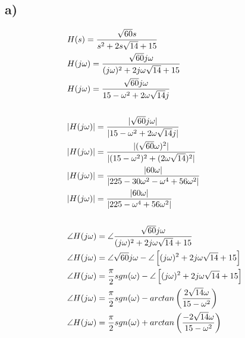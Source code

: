 \documentclass[11pt, fleqn]{article}
\begin{document}
\subsection*{a)}
\begin{align*}
    &H(s) = \frac{\sqrt{60}s}{s^2 + 2s\sqrt{14} + 15} \\
    &H(j\w) = \frac{\sqrt{60}j\w}{(j\w)^2 + 2j\w \sqrt{14} + 15} \\
    &H(j\w) = \frac{\sqrt{60}j\w}{15 - \w^2 + 2\w \sqrt{14}j} \\
    &\vspace*{2mm} \\
    &|H(j\w)| = \frac{|\sqrt{60}j\w|}{|15 - \w^2 + 2\w \sqrt{14}j|} \\
    &|H(j\w)| = \frac{|(\sqrt{60}\w)^2|}{|(15 - \w^2)^2 + (2\w \sqrt{14})^2|} \\ 
    &|H(j\w)| = \frac{|60\w|}{|225 - 30\w^2 - \w^4 + 56 \w^2|} \\
    &|H(j\w)| = \frac{|60\w|}{|225 - \w^4 + 56 \w^2|} \\
    &\vspace*{2mm} \\
    &\angle H(j\w) = \angle \frac{\sqrt{60}j\w}{(j\w)^2 + 2j\w\sqrt{14} + 15} \\
    &\angle H(j\w) = \angle \sqrt{60}j\w - \angle \brsquare{(j\w)^2 + 2j\w\sqrt{14} + 15} \\
    &\angle H(j\w) =\frac{\pi}{2}sgn(\w) - \angle \brsquare{(j\w)^2 + 2j\w\sqrt{14} + 15} \\
    &\angle H(j\w) =\frac{\pi}{2}sgn(\w) - arctan \brround{\frac{2\sqrt{14}\w}{15 - \w^2}} \\
    &\angle H(j\w) =\frac{\pi}{2}sgn(\w) + arctan \brround{\frac{-2\sqrt{14}\w}{15 - \w^2}}
\end{align*}
\end{document}
